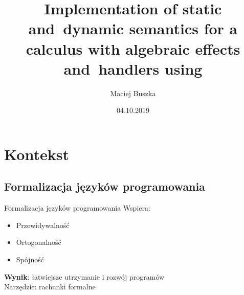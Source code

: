 \documentclass{beamer}
\title[A calculus with algebraic effects and~handlers]{Implementation of static and~dynamic semantics for a calculus with algebraic effects and~handlers using \Redex}
\author{Maciej Buszka}
\institute{Instytut Informatyki UWr}
\date{04.10.2019}
\begin{document}
\begin{frame}
  \titlepage
\end{frame}



\section{Kontekst}

\subsection{Formalizacja języków programowania}

\begin{frame}{Formalizacja języków programowania}
  Wspiera:
  \begin{itemize}
    \item Przewidywalność
    \item Ortogonalność
    \item Spójność
  \end{itemize} 
  \vspace{\baselineskip}
  \textbf{Wynik}: łatwiejsze utrzymanie i rozwój programów \\ %
  \vspace{\baselineskip}
  Narzędzie: rachunki formalne
\end{frame}


\end{document}
